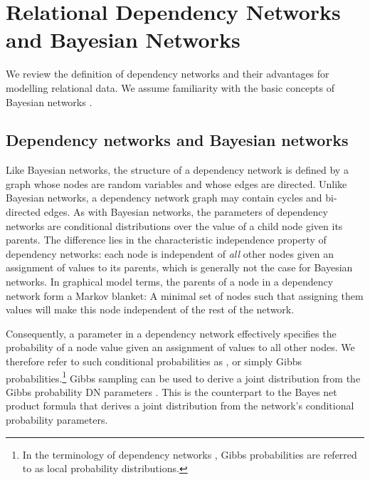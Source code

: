 \documentclass[runningheads,a4paper]{llncs}
\begin{document}
 \section{Relational Dependency Networks and Bayesian Networks} We review the definition of dependency networks and their advantages for modelling relational data. We assume familiarity with the basic concepts of Bayesian networks \cite{Pearl1988}.
 
 \subsection{Dependency networks and Bayesian networks} Like Bayesian networks, the structure of a dependency network is defined by a graph whose nodes are random variables and whose edges are directed. Unlike Bayesian networks, a dependency network graph may contain cycles and bi-directed edges. As with Bayesian networks, the parameters of dependency networks are conditional distributions over the value of a child node given its parents. The difference lies in the characteristic independence property of dependency networks: each node is independent of {\em all} other nodes given an assignment of values to its parents, which is generally not the case for Bayesian networks.
In graphical model terms, the parents of a node in a dependency network form a Markov blanket: A minimal set of nodes such that assigning them values will make this node independent of the rest of the network. 

Consequently, a parameter in a dependency network effectively specifies the probability of a node value given an assignment of values to all other nodes. 
We therefore refer to such conditional probabilities as , or simply Gibbs probabilities.\footnote{In the terminology of dependency networks \cite{Heckerman2000},  Gibbs  probabilities are referred to as local probability distributions.}
Gibbs sampling can be used to derive a joint distribution from the Gibbs probability DN parameters \cite{Heckerman2000,Neville2007}. This is the counterpart to the Bayes net product formula that derives a joint distribution from the network's conditional probability parameters. 
\end{document}
